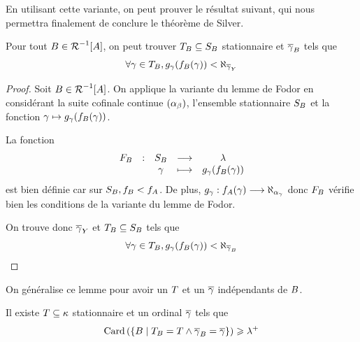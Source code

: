 En utilisant cette variante, on peut prouver le résultat suivant, qui nous
permettra finalement de conclure le théorème de Silver.

\begin{lemma}\label{lem.Silver.F}
  Pour tout $B\in\mathord{\mathrel{\mathcal{R}}}^{-1}[A]$, on peut trouver
  $T_{B}\subseteq S_{B}$
  stationnaire et $\overline{\gamma}_{B}$ tels que
  \[\forall \gamma \in T_{B},
  g_\gamma(f_{B}(\gamma)) < \aleph_{\overline{\gamma}_Y}\]
\end{lemma}

\begin{proof}
  Soit $B\in\mathord{\mathrel{\mathcal{R}}}^{-1}[A]$. On applique la variante du lemme de Fodor en
  considérant la suite cofinale continue $(\alpha_\beta)$, l'ensemble
  stationnaire $S_{B}$ et la fonction
  $\gamma\mapsto g_\gamma(f_{B}(\gamma))$.

  La fonction
  \[\makeFun{F_{\varPtB}}{\varSt_{\varPtB}}{\varCCl}
            {\varOc}{g_\varOc(f_{\varPtB}(\varOc))}\]
  est bien définie car sur $S_{B}, f_{B} < f_{A}$. De plus,
  $g_\gamma : \displaystyle f_{A}(\gamma) \longrightarrow \aleph_{\alpha_\gamma}$ donc
  $F_{B}$ vérifie bien les conditions de la variante du lemme de Fodor.

  On trouve donc $\overline{\gamma}_Y$ et
  $T_{B}\subseteq S_{B}$ tels que
  \[\forall \gamma \in T_{B},
  g_\gamma(f_{B}(\gamma)) < \aleph_{\overline{\gamma}_{B}}\qedhere\]
\end{proof}

On généralise ce lemme pour avoir un $T$ et un $\overline{\gamma}$
indépendants de $B$.

\begin{lemma}
  Il existe $T\subseteq \kappa$ stationnaire et un ordinal
  $\overline{\gamma}$ tels que
  \[\operatorname{Card}\left(
  \left\{ B \;\middle\vert\; T_{B} = T \land
    \overline{\gamma}_{B} = \overline{\gamma} \right\}\right) \geqslant\lambda^{+}\]
\end{lemma}


